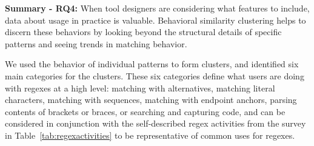\vspace{6pt}
\textbf{Summary - RQ4:}
When tool designers are considering what features to include, data about usage in practice is valuable.  Behavioral similarity clustering  helps to discern these behaviors by looking beyond the structural details of specific patterns and seeing trends in  matching behavior. %

We used the behavior of individual patterns to form clusters, and identified six main categories for the clusters.
These six categories define what users are doing with regexes at a high level: matching with alternatives, matching literal characters, matching with sequences, matching with endpoint anchors, parsing contents of brackets or braces, or searching and capturing code, and can be considered in conjunction with the self-described regex activities from the survey in Table~\ref{tab:regexactivities} to be representative of common uses for regexes.


